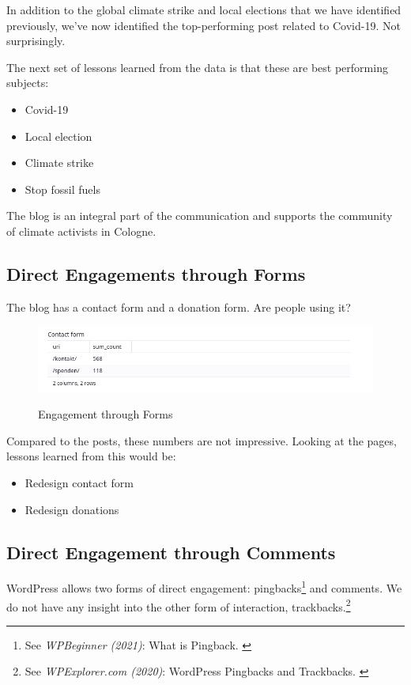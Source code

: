 In addition to the global climate strike and local elections that we have identified previously, we've now identified the top-performing post related to Covid-19. Not surprisingly.

The next set of lessons learned from the data is that these are best performing subjects:

\begin{itemize}
 \item Covid-19
 \item Local election
 \item Climate strike
 \item Stop fossil fuels
\end{itemize}

The blog is an integral part of the communication and supports the community of climate activists in Cologne.

\subsection{Direct Engagements through Forms}

The blog has a contact form and a donation form. Are people using it?

\begin{figure}[H]
\centering
\caption {Engagement through Forms}
\includegraphics[width=\linewidth]{images/figure14.png}
\label{fig:engagementForms}
\end{figure}

Compared to the posts, these numbers are not impressive. Looking at the pages, lessons learned from this would be:

\begin{itemize}
 \item Redesign contact form
 \item Redesign donations
\end{itemize}

\subsection{Direct Engagement through Comments}

WordPress allows two forms of direct engagement: pingbacks\footnote{See \textit{WPBeginner (2021)}: What is Pingback. \cite{pingBack}} and comments. We do not have any insight into the other form of interaction, trackbacks.\footnote{See \textit{WPExplorer.com (2020)}: WordPress Pingbacks and Trackbacks. \cite{trackBack}}

